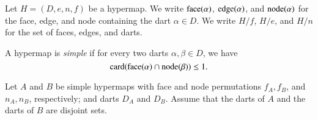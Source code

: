 Let $H=(D,e,n,f)$ be a hypermap.  We write
${\operatorname{face}}(\alpha)$, ${\operatorname{edge}}(\alpha)$, and ${\operatorname{node}}(\alpha)$
for the face, edge, and node containing the dart $\alpha\in D$.
We write $H/f$, $H/e$, and $H/n$ for the set of faces,
edges, and darts.
%
%
%
%
%

\begin{definition} 
A hypermap is {\it simple} if for every two darts
$\alpha,\beta\in D$, we have
    $${\operatorname{card}}{({\operatorname{face}}(\alpha) \cap {\operatorname{node}}(\beta))} \le 1.$$
\end{definition}

%

Let $A$ and $B$ be simple hypermaps with face and node
permutations
    $f_A,f_B$, and $n_A,n_B$, respectively; and darts $D_A$ and
    $D_B$.  Assume that the darts of $A$ and the darts of $B$ are
    disjoint sets.

